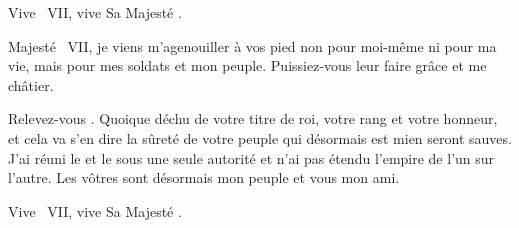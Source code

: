 \begin{drama}
  \peuplespeaks Vive \elena~VII, vive Sa Majesté \ela.

  \dariusspeaks {} Majesté \elena~VII, je viens m’agenouiller à vos pied non pour moi-même ni pour ma vie, mais pour mes soldats et mon peuple. Puissiez-vous leur faire grâce et me châtier.

  \elenaspeaks Relevez-vous \darius. Quoique déchu de votre titre de roi, votre rang et votre honneur, et cela va s’en dire la sûreté de votre peuple qui désormais est mien seront sauves. J’ai réuni le \campprincipal{} et le \campoppose{} sous une seule autorité et n’ai pas étendu l’empire de l’un sur l’autre. Les vôtres sont désormais mon peuple et vous mon ami.

   Vive \elena~VII, vive Sa Majesté \ela.



\end{drama}








